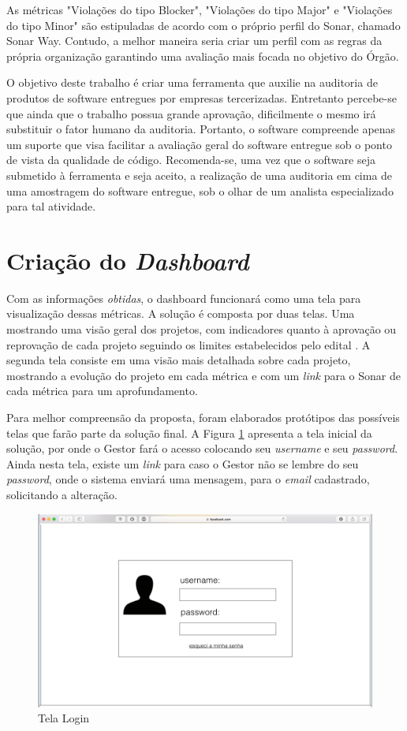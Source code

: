 As métricas "Violações do tipo Blocker", "Violações do tipo Major" e "Violações do tipo Minor" são estipuladas de acordo com o próprio perfil do Sonar, chamado Sonar Way. Contudo, a melhor maneira seria criar um perfil com as regras da própria organização garantindo uma avaliação mais focada no objetivo do Órgão.

O objetivo deste trabalho é criar uma ferramenta que auxilie na auditoria de produtos de software entregues por empresas tercerizadas. Entretanto percebe-se que ainda que o trabalho possua grande aprovação, dificilmente o mesmo irá substituir o fator humano da auditoria. Portanto, o software compreende apenas um suporte que visa facilitar a avaliação geral do software entregue sob o ponto de vista da qualidade de código. Recomenda-se, uma vez que o software seja submetido à ferramenta e seja aceito, a realização de uma auditoria em cima de uma amostragem do software entregue, sob o olhar de um analista especializado para tal atividade.

\section{Criação do \textit{Dashboard}}
Com as informações \textit{obtidas}, o dashboard funcionará como uma tela para visualização dessas métricas. A solução é composta por duas telas. Uma mostrando uma visão geral dos projetos, com indicadores quanto à aprovação ou reprovação de cada projeto seguindo os limites estabelecidos pelo edital \cite{edital}. A segunda tela consiste em uma visão mais detalhada sobre cada projeto, mostrando a evolução do projeto em cada métrica e com um \textit{link} para o Sonar de cada métrica para um aprofundamento.

Para melhor compreensão da proposta, foram elaborados protótipos das possíveis telas que farão parte da solução final. A Figura \ref{img:telaLogin} apresenta a tela inicial da solução, por onde o Gestor fará o acesso colocando seu \textit{username} e seu \textit{password}. Ainda nesta tela, existe um \textit{link} para caso o Gestor não se lembre do seu \textit{password}, onde o sistema enviará uma mensagem, para o \textit{email} cadastrado, solicitando a alteração.

\graphicspath{{figuras/}}
\begin{figure}[H]
\centering
\includegraphics[scale=0.60]{telaLogin.png}
\caption{Tela Login}
\label{img:telaLogin}
\end{figure}

